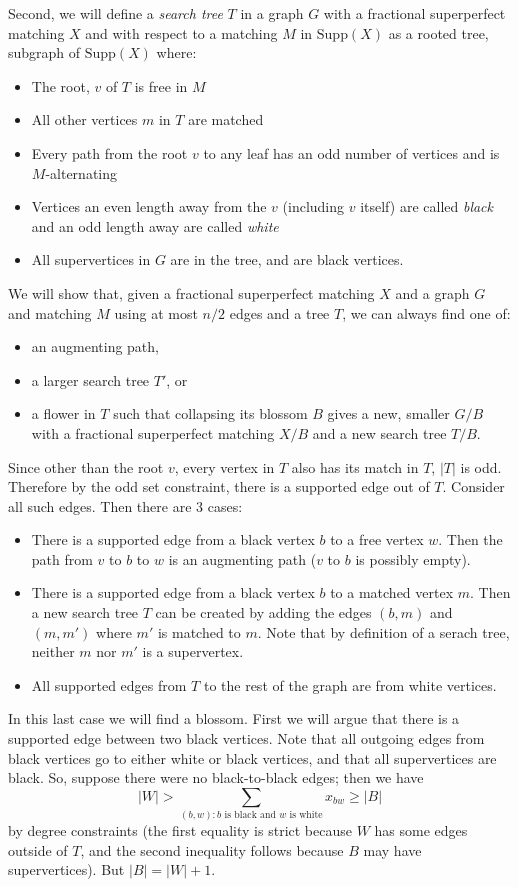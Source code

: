 \documentclass{hmcpset}
\begin{document}
\begin{solution}
\begin{enumerate}
Second, we will define a \emph{search tree} $T$ in a graph $G$ with a fractional superperfect matching $X$ and with respect to a matching $M$ in $\text{Supp}(X)$ as a rooted tree, subgraph of $\text{Supp}(X)$ where:
\begin{itemize}
\item The root, $v$ of $T$ is free in $M$
\item All other vertices $m$ in $T$ are matched
\item Every path from the root $v$ to any leaf has an odd number of vertices and is $M$-alternating
\item Vertices an even length away from the $v$ (including $v$ itself) are called \emph{black} and an odd length away are called \emph{white}
\item All supervertices in $G$ are in the tree, and are black vertices.
\end{itemize}

We will show that, given a fractional superperfect matching $X$ and a graph $G$ and matching $M$ using at most $n/2$ edges and a tree $T$, we can always find one of:
\begin{itemize} 
\item an augmenting path,
\item a larger search tree $T'$, or
\item a flower in $T$ such that collapsing its blossom $B$ gives a new, smaller $G/B$ with a fractional superperfect matching $X/B$ and a new search tree $T/B$.
\end{itemize}

Since other than the root $v$, every vertex in $T$ also has its match in $T$, $|T|$ is odd. Therefore by the odd set constraint, there is a supported edge out of $T$. Consider all such edges. Then there are 3 cases:
\begin{itemize}
\item There is a supported edge from a black vertex $b$ to a free vertex $w$. Then the path from $v$ to $b$ to $w$ is an augmenting path ($v$ to $b$ is possibly empty).
\item There is a supported edge from a black vertex $b$ to a matched vertex $m$. Then a new search tree $T$ can be created by adding the edges $(b,m)$ and $(m, m')$ where $m'$ is matched to $m$. Note that by definition of a serach tree, neither $m$ nor $m'$ is a supervertex.
\item All supported edges from $T$ to the rest of the graph are from white vertices.
\end{itemize}
In this last case we will find a blossom. First we will argue that there is a supported edge between two black vertices. Note that all outgoing edges from black vertices go to either white or black vertices, and that all supervertices are black. So, suppose there were no black-to-black edges; then we have
\[|W| > \sum_{(b,w): \text{$b$ is black and $w$ is white}} x_{bw} \geq |B|\]
by degree constraints (the first equality is strict because $W$ has some edges outside of $T$, and the second inequality follows because $B$ may have supervertices). But $|B| = |W| + 1$.


\end{enumerate}
\end{solution}
\end{document}

